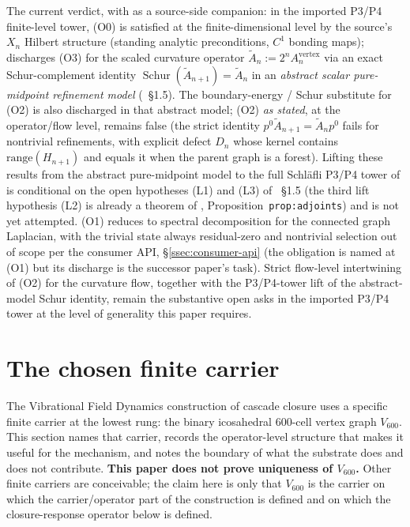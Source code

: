 \documentclass[11pt]{article}
\theoremstyle{definition}
\newcommand{\Vsub}{V_{600}}
\newcommand{\Schur}{\operatorname{Schur}}
\begin{document}
\noindent The current verdict, with
\cite{CascadeRefinementCompat} as a source-side companion: in the
imported P3/P4 finite-level tower, (O0) is satisfied at the
finite-dimensional level by the source's $X_n$ Hilbert structure
(standing analytic preconditions, $C^1$ bonding maps);
\cite{CascadeRefinementCompat} discharges (O3) for the scaled
curvature operator $\widetilde A_n := 2^n A_n^{\mathrm{vertex}}$
via an exact Schur-complement identity
$\Schur(\widetilde A_{n+1}) = \widetilde A_n$ in an
\emph{abstract scalar pure-midpoint refinement model}
(\cite{CascadeRefinementCompat}~\S1.5). The boundary-energy /
Schur substitute for (O2) is also discharged in that abstract
model; (O2) \emph{as stated}, at the operator/flow level, remains
false (the strict identity
$p^{0} \widetilde A_{n+1} = \widetilde A_n p^{0}$ fails for
nontrivial refinements, with explicit defect $D_n$ whose kernel
contains $\mathrm{range}(H_{n+1})$ and equals it when the parent
graph is a forest). Lifting these results from the abstract
pure-midpoint model to the full Schl\"{a}fli P3/P4 tower of
\cite{CascadeRefinementSpaces, CascadeClosureDynamics} is
conditional on the open hypotheses \textup{(L1)} and
\textup{(L3)} of \cite{CascadeRefinementCompat}~\S1.5 (the third
lift hypothesis \textup{(L2)} is already a theorem of
\cite{CascadeRefinementSpaces}, Proposition~\texttt{prop:adjoints})
and is not yet attempted. (O1)
reduces to spectral decomposition for the connected graph
Laplacian, with the trivial state always residual-zero and
nontrivial selection out of scope per the consumer API,
\S\ref{ssec:consumer-api} (the obligation is named at (O1) but its
discharge is the successor paper's task). Strict flow-level
intertwining of (O2) for the curvature flow, together with the
P3/P4-tower lift of the abstract-model Schur identity, remain the
substantive open asks in the imported P3/P4 tower at the level of
generality this paper requires.

\section{The chosen finite carrier}\label{sec:carrier}

The Vibrational Field Dynamics construction of cascade closure uses
a specific finite carrier at the lowest rung: the binary icosahedral
600-cell vertex graph $\Vsub$. This section names that carrier,
records the operator-level structure that makes it useful for the
mechanism, and notes the boundary of what the substrate does and does
not contribute. \textbf{This paper does not prove uniqueness of $\Vsub$.}
Other finite carriers are conceivable; the claim here is only that
$\Vsub$ is the carrier on which the carrier/operator part of the construction is defined
and on which the closure-response operator below is defined.
\end{document}
